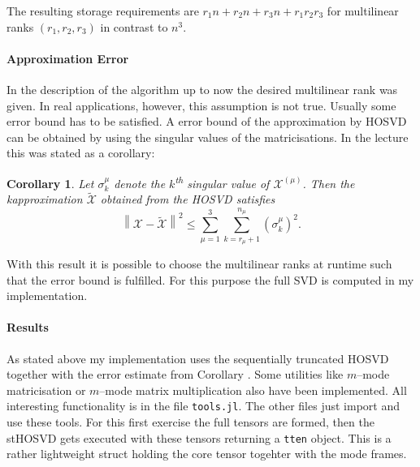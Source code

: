 \documentclass[%
a4paper,
parskip=half,
DIV=calc,
]
{scrartcl}
\newtheorem{corollary}[theorem]{Corollary}
\begin{document}
The resulting storage requirements are
$r_1 n + r_2 n + r_3 n + r_1 r_2 r_3$ for multilinear ranks
$(r_1, r_2, r_3)$ in contrast to $n^3$.

\paragraph{Approximation Error}

In the description of the algorithm up to now the desired multilinear
rank was given.  In real applications, however, this assumption is not
true.  Usually some error bound has to be satisfied.  A error bound of
the approximation by HOSVD can be obtained by using the singular
values of the matricisations.  In the lecture this was stated as a corollary:
\begin{corollary}
  \label{cor:err}
  Let $\sigma_k^{\mu}$ denote the $k$\textsuperscript{th} singular
  value of $\mathcal{X}^{(\mu)}$.  Then the kapproximation
  $\tilde{\mathcal{X}}$ obtained from the HOSVD satisfies
  \begin{equation*}
    \left\| \mathcal{X} - \tilde{\mathcal{X}} \right\|^2 \leq \sum_{\mu = 1}^3 \sum_{k = r_\mu + 1}^{n_\mu}
    \left( \sigma_k^\mu \right)^2.
  \end{equation*}
\end{corollary}
With this result it is possible to choose the multilinear ranks at
runtime such that the error bound is fulfilled.  For this purpose the
full SVD is computed in my implementation.

\paragraph{Results}

As stated above my implementation uses the sequentially truncated
HOSVD together with the error estimate from Corollary \label{cor:err}.
Some utilities like $m$--mode matricisation or $m$--mode matrix
multiplication also have been implemented. All interesting
functionality is in the file \texttt{tools.jl}. The other files just
import and use these tools.  For this first exercise the full tensors
are formed, then the stHOSVD gets executed with these tensors
returning a \texttt{tten} object. This is a rather lightweight struct
holding the core tensor togehter with the mode frames.
\end{document}
